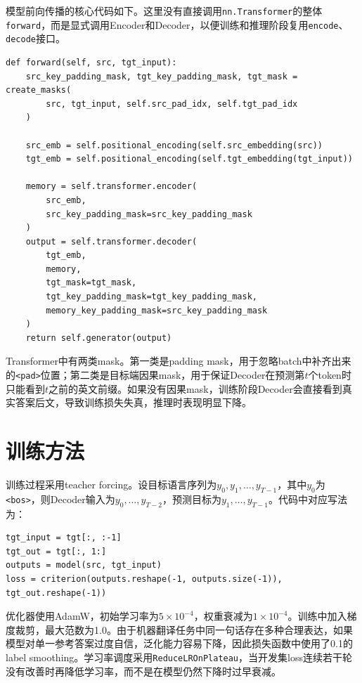 \documentclass[11pt]{article}
\begin{document}
	模型前向传播的核心代码如下。这里没有直接调用\texttt{nn.Transformer}的整体\texttt{forward}，而是显式调用Encoder和Decoder，以便训练和推理阶段复用\texttt{encode}、\texttt{decode}接口。

	\begin{lstlisting}
def forward(self, src, tgt_input):
    src_key_padding_mask, tgt_key_padding_mask, tgt_mask = create_masks(
        src, tgt_input, self.src_pad_idx, self.tgt_pad_idx
    )

    src_emb = self.positional_encoding(self.src_embedding(src))
    tgt_emb = self.positional_encoding(self.tgt_embedding(tgt_input))

    memory = self.transformer.encoder(
        src_emb,
        src_key_padding_mask=src_key_padding_mask
    )
    output = self.transformer.decoder(
        tgt_emb,
        memory,
        tgt_mask=tgt_mask,
        tgt_key_padding_mask=tgt_key_padding_mask,
        memory_key_padding_mask=src_key_padding_mask
    )
    return self.generator(output)
	\end{lstlisting}

	Transformer中有两类mask。第一类是padding mask，用于忽略batch中补齐出来的\texttt{<pad>}位置；第二类是目标端因果mask，用于保证Decoder在预测第$t$个token时只能看到$t$之前的英文前缀。如果没有因果mask，训练阶段Decoder会直接看到真实答案后文，导致训练损失失真，推理时表现明显下降。

	\section{训练方法}
	训练过程采用teacher forcing。设目标语言序列为$y_0,y_1,\ldots,y_{T-1}$，其中$y_0$为\texttt{<bos>}，则Decoder输入为$y_0,\ldots,y_{T-2}$，预测目标为$y_1,\ldots,y_{T-1}$。代码中对应写法为：

	\begin{lstlisting}
tgt_input = tgt[:, :-1]
tgt_out = tgt[:, 1:]
outputs = model(src, tgt_input)
loss = criterion(outputs.reshape(-1, outputs.size(-1)), tgt_out.reshape(-1))
	\end{lstlisting}

	优化器使用AdamW，初始学习率为$5\times10^{-4}$，权重衰减为$1\times10^{-4}$。训练中加入梯度裁剪，最大范数为1.0。由于机器翻译任务中同一句话存在多种合理表达，如果模型对单一参考答案过度自信，泛化能力容易下降，因此损失函数中使用了0.1的label smoothing。学习率调度采用\texttt{ReduceLROnPlateau}，当开发集loss连续若干轮没有改善时再降低学习率，而不是在模型仍然下降时过早衰减。
\end{document}
